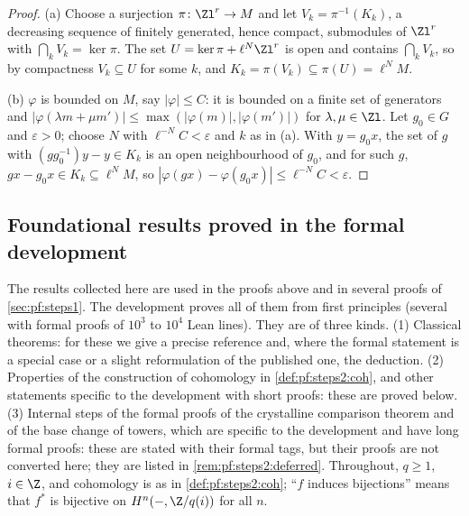 \begin{proof}
(a) Choose a surjection $\pi\colon\Zl^r\to M$ and let $V_k=\pi^{-1}(K_k)$, a decreasing sequence of
finitely generated, hence compact, submodules of $\Zl^r$ with $\bigcap_kV_k=\ker\pi$. The set
$U=\ker\pi+\ell^N\Zl^r$ is open and contains $\bigcap_kV_k$, so by compactness $V_k\subseteq U$ for some
$k$, and $K_k=\pi(V_k)\subseteq\pi(U)=\ell^NM$.

(b) $\varphi$ is bounded on $M$, say $|\varphi|\le C$: it is bounded on a finite set of generators and
$|\varphi(\lambda m+\mu m')|\le\max(|\varphi(m)|,|\varphi(m')|)$ for $\lambda,\mu\in\Zl$. Let $g_0\in G$
and $\varepsilon>0$; choose $N$ with $\ell^{-N}C<\varepsilon$ and $k$ as in (a). With $y=g_0x$, the set
of $g$ with $(gg_0^{-1})y-y\in K_k$ is an open neighbourhood of $g_0$, and for such $g$,
$gx-g_0x\in K_k\subseteq\ell^NM$, so $|\varphi(gx)-\varphi(g_0x)|\le\ell^{-N}C<\varepsilon$.
\end{proof}

\subsection{Foundational results proved in the formal development}\label{sec:pf:steps2:found}

The results collected here are used in the proofs above and in several proofs of
\cref{sec:pf:steps1}. The development proves all of them from first principles (several with formal
proofs of $10^3$ to $10^4$ Lean lines). They are of three kinds. (1) Classical theorems: for these we
give a precise reference and, where the formal statement is a special case or a slight reformulation
of the published one, the deduction. (2) Properties of the construction of cohomology in
\cref{def:pf:steps2:coh}, and other statements specific to the development with short proofs: these
are proved below. (3) Internal steps of the formal proofs of the crystalline comparison theorem and of
the base change of towers, which are specific to the development and have long formal proofs: these
are stated with their formal tags, but their proofs are not converted here; they are listed in
\cref{rem:pf:steps2:deferred}. Throughout, $q\ge1$, $i\in\Z$, and cohomology is as in \cref{def:pf:steps2:coh}; ``$f$
induces bijections'' means that $f^\ast$ is bijective on $H^n(-,\Z/q(i))$ for all $n$.

